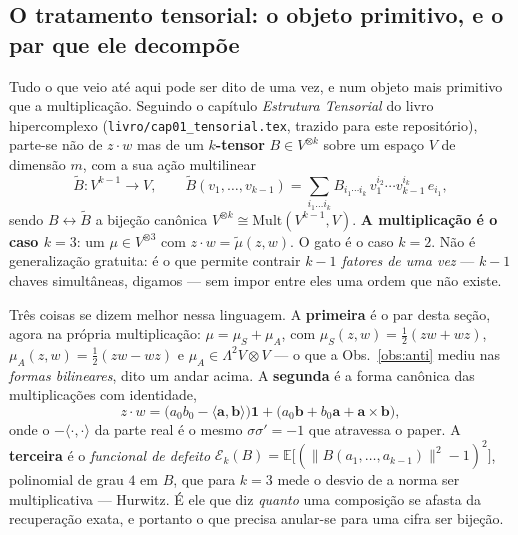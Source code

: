 \documentclass[11pt]{article}
\newcommand{\code}[1]{\texttt{\small #1}}
\theoremstyle{plain}
\theoremstyle{remark}
\begin{document}
\subsection*{O tratamento tensorial: o objeto primitivo, e o par que ele decompõe}

Tudo o que veio até aqui pode ser dito de uma vez, e num objeto mais primitivo que a
multiplicação. Seguindo o capítulo \emph{Estrutura Tensorial} do livro hipercomplexo
(\code{livro/cap01\_tensorial.tex}, trazido para este repositório), parte-se não de $z\cdot w$ mas
de um \textbf{$k$-tensor} $B\in V^{\otimes k}$ sobre um espaço $V$ de dimensão $m$, com a sua ação
multilinear
\[
 \widetilde B:V^{k-1}\to V,\qquad
 \widetilde B(v_1,\dots,v_{k-1})=\sum_{i_1\dots i_k}B_{i_1\cdots i_k}\,v_1^{i_2}\cdots v_{k-1}^{i_k}\,e_{i_1},
\]
sendo $B\leftrightarrow\widetilde B$ a bijeção canônica $V^{\otimes k}\cong\mathrm{Mult}(V^{k-1},V)$.
\textbf{A multiplicação é o caso $k=3$}: um $\mu\in V^{\otimes3}$ com $z\cdot w=\widetilde\mu(z,w)$.
O gato é o caso $k=2$. Não é generalização gratuita: é o que permite contrair \emph{$k-1$ fatores de
uma vez} --- $k-1$ chaves simultâneas, digamos --- sem impor entre eles uma ordem que não existe.

Três coisas se dizem melhor nessa linguagem. A \textbf{primeira} é o par desta seção, agora na
própria multiplicação: $\mu=\mu_S+\mu_A$, com $\mu_S(z,w)=\tfrac12(zw+wz)$,
$\mu_A(z,w)=\tfrac12(zw-wz)$ e $\mu_A\in\Lambda^2V\otimes V$ --- o que a Obs.~\ref{obs:anti} mediu
nas \emph{formas bilineares}, dito um andar acima. A \textbf{segunda} é a forma canônica das
multiplicações com identidade,
\[
 z\cdot w=\bigl(a_0b_0-\langle\boldsymbol a,\boldsymbol b\rangle\bigr)\mathbf 1
 +\bigl(a_0\boldsymbol b+b_0\boldsymbol a+\boldsymbol a\times\boldsymbol b\bigr),
\]
onde o $-\langle\cdot,\cdot\rangle$ da parte real é o mesmo $\sigma\sigma'=-1$ que atravessa o paper.
A \textbf{terceira} é o \emph{funcional de defeito}
$\mathcal E_k(B)=\mathbb E\bigl[(\lVert B(a_1,\dots,a_{k-1})\rVert^2-1)^2\bigr]$, polinomial de grau
$4$ em $B$, que para $k=3$ mede o desvio de a norma ser multiplicativa --- Hurwitz. É ele que diz
\emph{quanto} uma composição se afasta da recuperação exata, e portanto o que precisa anular-se para
uma cifra ser bijeção.
\end{document}
